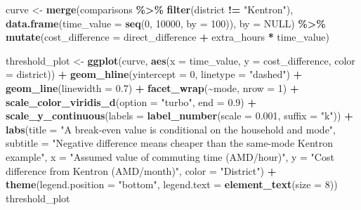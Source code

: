 \documentclass[
]{article}
\newenvironment{Shaded}{\begin{snugshade}}{\end{snugshade}}
\newcommand{\AttributeTok}[1]{\textcolor[rgb]{0.13,0.29,0.53}{#1}}
\newcommand{\ConstantTok}[1]{\textcolor[rgb]{0.56,0.35,0.01}{#1}}
\newcommand{\DecValTok}[1]{\textcolor[rgb]{0.00,0.00,0.81}{#1}}
\newcommand{\FloatTok}[1]{\textcolor[rgb]{0.00,0.00,0.81}{#1}}
\newcommand{\FunctionTok}[1]{\textcolor[rgb]{0.13,0.29,0.53}{\textbf{#1}}}
\newcommand{\NormalTok}[1]{#1}
\newcommand{\OtherTok}[1]{\textcolor[rgb]{0.56,0.35,0.01}{#1}}
\newcommand{\SpecialCharTok}[1]{\textcolor[rgb]{0.81,0.36,0.00}{\textbf{#1}}}
\newcommand{\StringTok}[1]{\textcolor[rgb]{0.31,0.60,0.02}{#1}}
\begin{document}
\begin{Shaded}
\begin{Highlighting}[]
\NormalTok{curve }\OtherTok{\textless{}{-}} \FunctionTok{merge}\NormalTok{(comparisons }\SpecialCharTok{\%\textgreater{}\%} \FunctionTok{filter}\NormalTok{(district }\SpecialCharTok{!=} \StringTok{"Kentron"}\NormalTok{),}
               \FunctionTok{data.frame}\NormalTok{(}\AttributeTok{time\_value =} \FunctionTok{seq}\NormalTok{(}\DecValTok{0}\NormalTok{, }\DecValTok{10000}\NormalTok{, }\AttributeTok{by =} \DecValTok{100}\NormalTok{)), }\AttributeTok{by =} \ConstantTok{NULL}\NormalTok{) }\SpecialCharTok{\%\textgreater{}\%}
  \FunctionTok{mutate}\NormalTok{(}\AttributeTok{cost\_difference =}\NormalTok{ direct\_difference }\SpecialCharTok{+}\NormalTok{ extra\_hours }\SpecialCharTok{*}\NormalTok{ time\_value)}

\NormalTok{threshold\_plot }\OtherTok{\textless{}{-}} \FunctionTok{ggplot}\NormalTok{(curve, }\FunctionTok{aes}\NormalTok{(}\AttributeTok{x =}\NormalTok{ time\_value, }\AttributeTok{y =}\NormalTok{ cost\_difference, }\AttributeTok{color =}\NormalTok{ district)) }\SpecialCharTok{+}
  \FunctionTok{geom\_hline}\NormalTok{(}\AttributeTok{yintercept =} \DecValTok{0}\NormalTok{, }\AttributeTok{linetype =} \StringTok{"dashed"}\NormalTok{) }\SpecialCharTok{+} \FunctionTok{geom\_line}\NormalTok{(}\AttributeTok{linewidth =} \FloatTok{0.7}\NormalTok{) }\SpecialCharTok{+}
  \FunctionTok{facet\_wrap}\NormalTok{(}\SpecialCharTok{\textasciitilde{}}\NormalTok{mode, }\AttributeTok{nrow =} \DecValTok{1}\NormalTok{) }\SpecialCharTok{+}
  \FunctionTok{scale\_color\_viridis\_d}\NormalTok{(}\AttributeTok{option =} \StringTok{"turbo"}\NormalTok{, }\AttributeTok{end =} \FloatTok{0.9}\NormalTok{) }\SpecialCharTok{+}
  \FunctionTok{scale\_y\_continuous}\NormalTok{(}\AttributeTok{labels =} \FunctionTok{label\_number}\NormalTok{(}\AttributeTok{scale =} \FloatTok{0.001}\NormalTok{, }\AttributeTok{suffix =} \StringTok{"k"}\NormalTok{)) }\SpecialCharTok{+}
  \FunctionTok{labs}\NormalTok{(}\AttributeTok{title =} \StringTok{"A break{-}even value is conditional on the household and mode"}\NormalTok{,}
       \AttributeTok{subtitle =} \StringTok{"Negative difference means cheaper than the same{-}mode Kentron example"}\NormalTok{,}
       \AttributeTok{x =} \StringTok{"Assumed value of commuting time (AMD/hour)"}\NormalTok{, }\AttributeTok{y =} \StringTok{"Cost difference from Kentron (AMD/month)"}\NormalTok{, }\AttributeTok{color =} \StringTok{"District"}\NormalTok{) }\SpecialCharTok{+}
  \FunctionTok{theme}\NormalTok{(}\AttributeTok{legend.position =} \StringTok{"bottom"}\NormalTok{, }\AttributeTok{legend.text =} \FunctionTok{element\_text}\NormalTok{(}\AttributeTok{size =} \DecValTok{8}\NormalTok{))}
\NormalTok{threshold\_plot}
\end{Highlighting}
\end{Shaded}
\end{document}
